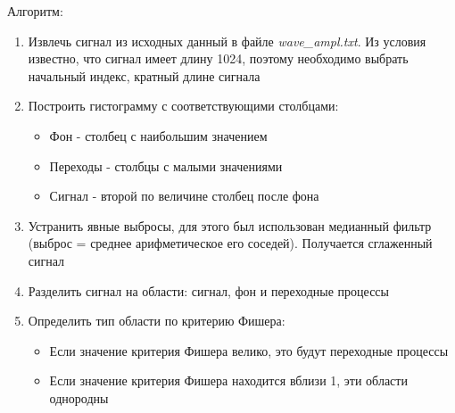 \documentclass[12pt,a4paper]{article}
\begin{document}
Алгоритм:
\begin{enumerate}
    \item Извлечь сигнал из исходных данный в файле \textit{wave\_ampl.txt}. Из условия известно, что сигнал имеет длину 1024, поэтому необходимо выбрать начальный индекс, кратный длине сигнала
    \item Построить гистограмму с соответствующими столбцами:
        \begin{itemize}
            \item Фон - столбец с наибольшим значением
            \item Переходы - столбцы с малыми значениями
            \item Сигнал - второй по величине столбец после фона
        \end{itemize}
    \item Устранить явные выбросы, для этого был использован медианный фильтр (выброс = среднее арифметическое его соседей). Получается сглаженный сигнал
    \item Разделить сигнал на области: сигнал, фон и переходные процессы
    \item Определить тип области по критерию Фишера:
        \begin{itemize}
            \item Если значение критерия Фишера велико, это будут переходные процессы
            \item Если значение критерия Фишера находится вблизи 1, эти области однородны
        \end{itemize}
\end{enumerate}
\end{document}
